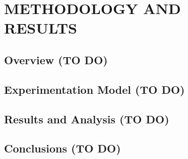 \chapter{METHODOLOGY AND RESULTS}



\section{Overview (TO DO)}


\section{Experimentation Model (TO DO)}
\label{sec:experiment-methodology}


\section{Results and Analysis (TO DO)}


\section{Conclusions (TO DO)}



